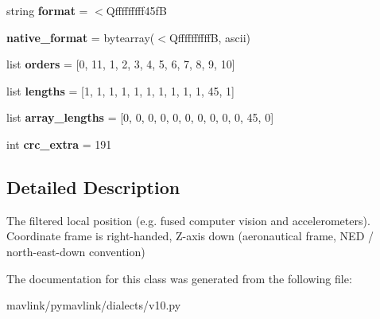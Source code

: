 \begin{DoxyCompactItemize}
\item 
\mbox{\label{classpymavlink_1_1dialects_1_1v10_1_1MAVLink__local__position__ned__cov__message_a7cc37bcfbe1773388103249d4e3f8aa1}} 
string {\bfseries format} = \textquotesingle{}$<$Qfffffffff45fB\textquotesingle{}
\item 
\mbox{\label{classpymavlink_1_1dialects_1_1v10_1_1MAVLink__local__position__ned__cov__message_a169546d8f03a8861f05ac4bbd68d21df}} 
{\bfseries native\+\_\+format} = bytearray(\textquotesingle{}$<$QffffffffffB\textquotesingle{}, \textquotesingle{}ascii\textquotesingle{})
\item 
\mbox{\label{classpymavlink_1_1dialects_1_1v10_1_1MAVLink__local__position__ned__cov__message_a1969e06a8d3427153cf45fa440ef4b0f}} 
list {\bfseries orders} = \mbox{[}0, 11, 1, 2, 3, 4, 5, 6, 7, 8, 9, 10\mbox{]}
\item 
\mbox{\label{classpymavlink_1_1dialects_1_1v10_1_1MAVLink__local__position__ned__cov__message_af5d8ad3438378c583b7b894e509653c1}} 
list {\bfseries lengths} = \mbox{[}1, 1, 1, 1, 1, 1, 1, 1, 1, 1, 45, 1\mbox{]}
\item 
\mbox{\label{classpymavlink_1_1dialects_1_1v10_1_1MAVLink__local__position__ned__cov__message_a5f47de58a0bb499bf3e4eea12c7d8d21}} 
list {\bfseries array\+\_\+lengths} = \mbox{[}0, 0, 0, 0, 0, 0, 0, 0, 0, 0, 45, 0\mbox{]}
\item 
\mbox{\label{classpymavlink_1_1dialects_1_1v10_1_1MAVLink__local__position__ned__cov__message_acdcdb3ad94d5114a966137cde7bcabb2}} 
int {\bfseries crc\+\_\+extra} = 191
\end{DoxyCompactItemize}


\subsection{Detailed Description}
\begin{DoxyVerb}The filtered local position (e.g. fused computer vision and
accelerometers). Coordinate frame is right-handed, Z-axis down
(aeronautical frame, NED / north-east-down convention)
\end{DoxyVerb}
 

The documentation for this class was generated from the following file\+:\begin{DoxyCompactItemize}
\item 
mavlink/pymavlink/dialects/v10.\+py\end{DoxyCompactItemize}

